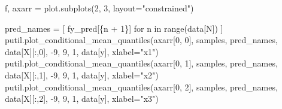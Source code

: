 \documentclass[
  letterpaper,
  DIV=11,
  numbers=noendperiod]{scrartcl}
\newenvironment{Shaded}{\begin{snugshade}}{\end{snugshade}}
\newcommand{\BuiltInTok}[1]{\textcolor[rgb]{0.00,0.23,0.31}{#1}}
\newcommand{\ControlFlowTok}[1]{\textcolor[rgb]{0.00,0.23,0.31}{#1}}
\newcommand{\DecValTok}[1]{\textcolor[rgb]{0.68,0.00,0.00}{#1}}
\newcommand{\KeywordTok}[1]{\textcolor[rgb]{0.00,0.23,0.31}{#1}}
\newcommand{\NormalTok}[1]{\textcolor[rgb]{0.00,0.23,0.31}{#1}}
\newcommand{\OperatorTok}[1]{\textcolor[rgb]{0.37,0.37,0.37}{#1}}
\newcommand{\SpecialCharTok}[1]{\textcolor[rgb]{0.37,0.37,0.37}{#1}}
\newcommand{\SpecialStringTok}[1]{\textcolor[rgb]{0.13,0.47,0.30}{#1}}
\newcommand{\StringTok}[1]{\textcolor[rgb]{0.13,0.47,0.30}{#1}}
\begin{document}
\begin{Shaded}
\begin{Highlighting}[]
\NormalTok{f, axarr }\OperatorTok{=}\NormalTok{ plot.subplots(}\DecValTok{2}\NormalTok{, }\DecValTok{3}\NormalTok{, layout}\OperatorTok{=}\StringTok{"constrained"}\NormalTok{)}

\NormalTok{pred\_names }\OperatorTok{=}\NormalTok{ [ }\SpecialStringTok{f\textquotesingle{}y\_pred[}\SpecialCharTok{\{}\NormalTok{n }\OperatorTok{+} \DecValTok{1}\SpecialCharTok{\}}\SpecialStringTok{]\textquotesingle{}} \ControlFlowTok{for}\NormalTok{ n }\KeywordTok{in} \BuiltInTok{range}\NormalTok{(data[}\StringTok{\textquotesingle{}N\textquotesingle{}}\NormalTok{]) ]}
\NormalTok{putil.plot\_conditional\_mean\_quantiles(axarr[}\DecValTok{0}\NormalTok{, }\DecValTok{0}\NormalTok{], samples, pred\_names,}
\NormalTok{                                      data[}\StringTok{\textquotesingle{}X\textquotesingle{}}\NormalTok{][:,}\DecValTok{0}\NormalTok{], }\OperatorTok{{-}}\DecValTok{9}\NormalTok{, }\DecValTok{9}\NormalTok{, }\DecValTok{1}\NormalTok{,}
\NormalTok{                                      data[}\StringTok{\textquotesingle{}y\textquotesingle{}}\NormalTok{], xlabel}\OperatorTok{=}\StringTok{"x1"}\NormalTok{)}
\NormalTok{putil.plot\_conditional\_mean\_quantiles(axarr[}\DecValTok{0}\NormalTok{, }\DecValTok{1}\NormalTok{], samples, pred\_names,}
\NormalTok{                                      data[}\StringTok{\textquotesingle{}X\textquotesingle{}}\NormalTok{][:,}\DecValTok{1}\NormalTok{], }\OperatorTok{{-}}\DecValTok{9}\NormalTok{, }\DecValTok{9}\NormalTok{, }\DecValTok{1}\NormalTok{,}
\NormalTok{                                      data[}\StringTok{\textquotesingle{}y\textquotesingle{}}\NormalTok{], xlabel}\OperatorTok{=}\StringTok{"x2"}\NormalTok{)}
\NormalTok{putil.plot\_conditional\_mean\_quantiles(axarr[}\DecValTok{0}\NormalTok{, }\DecValTok{2}\NormalTok{], samples, pred\_names,}
\NormalTok{                                      data[}\StringTok{\textquotesingle{}X\textquotesingle{}}\NormalTok{][:,}\DecValTok{2}\NormalTok{], }\OperatorTok{{-}}\DecValTok{9}\NormalTok{, }\DecValTok{9}\NormalTok{, }\DecValTok{1}\NormalTok{,}
\NormalTok{                                      data[}\StringTok{\textquotesingle{}y\textquotesingle{}}\NormalTok{], xlabel}\OperatorTok{=}\StringTok{"x3"}\NormalTok{)}


\end{Highlighting}
\end{Shaded}
\end{document}
